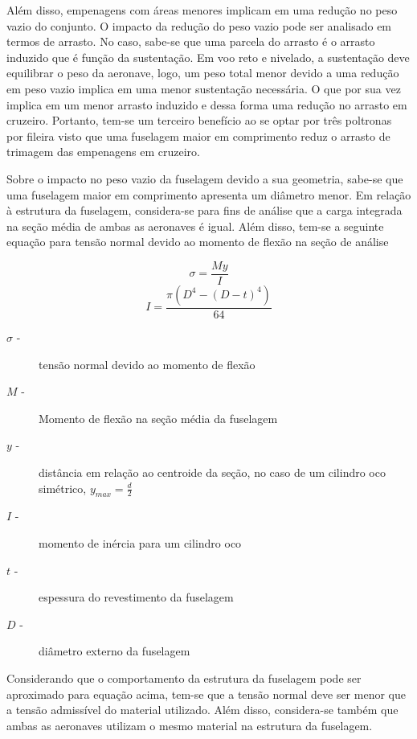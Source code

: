 Além disso, empenagens com áreas menores implicam em uma redução no peso vazio do conjunto.
O impacto da redução do peso vazio pode ser analisado em termos de arrasto.
No caso, sabe-se que uma parcela do arrasto é o arrasto induzido que é função da sustentação.
Em voo reto e nivelado, a sustentação deve equilibrar o peso da aeronave, logo, um peso total menor devido a uma redução em peso vazio implica em uma menor sustentação necessária.
O que por sua vez implica em um menor arrasto induzido e dessa forma uma redução no arrasto em cruzeiro. 
Portanto, tem-se um terceiro benefício ao se optar por três poltronas por fileira visto que uma fuselagem maior em comprimento reduz o arrasto de trimagem das empenagens em cruzeiro.

Sobre o impacto no peso vazio da fuselagem devido a sua geometria, sabe-se que uma fuselagem maior em comprimento apresenta um diâmetro menor. Em relação à estrutura da fuselagem, considera-se para fins de análise que a carga integrada na seção média de ambas as aeronaves é igual. Além disso, tem-se a seguinte equação para tensão normal devido ao momento de flexão na seção de análise

\begin{equation}
\sigma =  \frac{M y }{I} 
\end{equation}
\begin{equation}
I =  \frac{\pi(D^4 - (D-t)^4)}{64}
\end{equation}

\begin{description}
	\item[$\sigma$ -] tensão normal devido ao momento de flexão
    \item[$M$ -] Momento de flexão na seção média da fuselagem
    \item[$y$ -] distância em relação ao centroide da seção, no caso de um cilindro oco simétrico, $y_{max} = \frac{d}{2}$
    \item[$I$ -] momento de inércia para um cilindro oco
    \item[$t$ -] espessura do revestimento da fuselagem
    \item[$D$ -] diâmetro externo da fuselagem
\end{description}

Considerando que o comportamento da estrutura da fuselagem pode ser aproximado para equação acima, tem-se que a tensão normal deve ser menor que a tensão admissível do material utilizado.
Além disso, considera-se também que ambas as aeronaves utilizam o mesmo material na estrutura da fuselagem.

